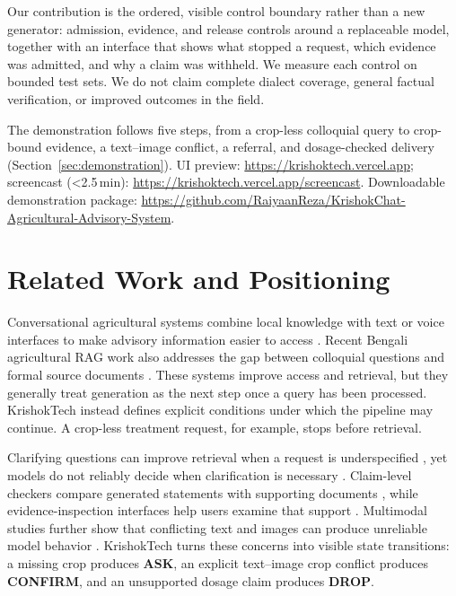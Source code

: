 \documentclass[11pt,a4paper]{article}
\begin{document}
Our contribution is the ordered, visible control boundary rather than a new generator: admission, evidence, and release controls around a replaceable model, together with an interface that shows what stopped a request, which evidence was admitted, and why a claim was withheld. We measure each control on bounded test sets. We do not claim complete dialect coverage, general factual verification, or improved outcomes in the field.

The demonstration follows five steps, from a crop-less colloquial query to crop-bound evidence, a text--image conflict, a referral, and dosage-checked delivery (Section~\ref{sec:demonstration}). UI preview: \url{https://krishoktech.vercel.app}; screencast (\textless{}2.5\,min): \url{https://krishoktech.vercel.app/screencast}. Downloadable demonstration package: \url{https://github.com/RaiyaanReza/KrishokChat-Agricultural-Advisory-System}.

\section{Related Work and Positioning}
\label{sec:related_work}

Conversational agricultural systems combine local knowledge with text or voice interfaces to make advisory information easier to access \citep{farmerchat2024,krishokbondhu2026,vijayvargia2025}. Recent Bengali agricultural RAG work also addresses the gap between colloquial questions and formal source documents \citep{hossain2026}. These systems improve access and retrieval, but they generally treat generation as the next step once a query has been processed. KrishokTech instead defines explicit conditions under which the pipeline may continue. A crop-less treatment request, for example, stops before retrieval.

Clarifying questions can improve retrieval when a request is underspecified \citep{aliannejadi-etal-2019-clarifying}, yet models do not reliably decide when clarification is necessary \citep{chen2024act,gan2024clarqllm}. Claim-level checkers compare generated statements with supporting documents \citep{tang2024minicheck,ji2026medragchecker}, while evidence-inspection interfaces help users examine that support \citep{fang-mackenzie-2026-factsearch,murugaraj-etal-2026-ragvue}. Multimodal studies further show that conflicting text and images can produce unreliable model behavior \citep{Deng_2025_CVPR,zhu2024cross}. KrishokTech turns these concerns into visible state transitions: a missing crop produces \textbf{ASK}, an explicit text--image crop conflict produces \textbf{CONFIRM}, and an unsupported dosage claim produces \textbf{DROP}.
\end{document}
